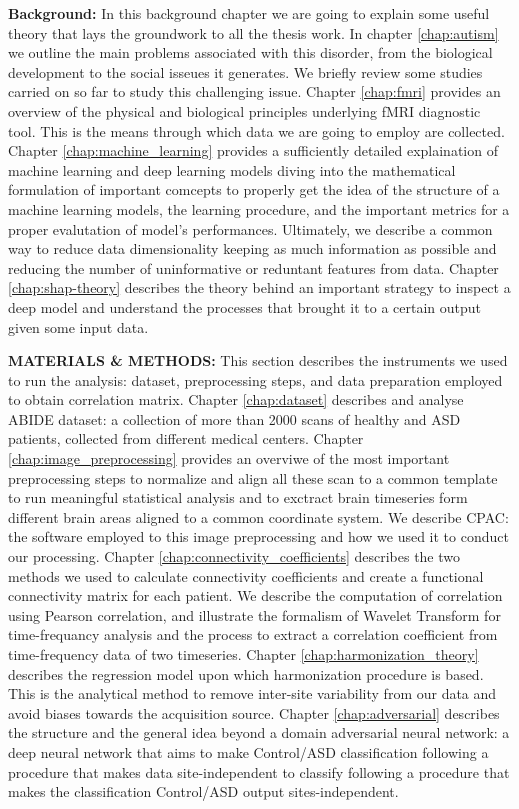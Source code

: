 \documentclass[10pt]{report}
\begin{document}
\textbf{Background:} In this background chapter we are going to explain some useful theory that lays the groundwork to all the thesis work.
In chapter \ref{chap:autism} we outline the main problems associated with this disorder, from the biological development to the social isseues it generates. We briefly review some studies carried on so far to study this challenging issue.
Chapter \ref{chap:fmri} provides an overview of the physical and biological principles underlying fMRI diagnostic tool. This is the means through which data we are going to employ are collected.
Chapter \ref{chap:machine_learning} provides a sufficiently detailed explaination of machine learning and deep learning models diving into the mathematical formulation of important comcepts to properly get the idea of the structure of a machine learning models, the learning procedure, and the important metrics for a proper evalutation of model's performances. Ultimately, we describe a common way to reduce data dimensionality keeping as much information as possible and reducing the number of uninformative or reduntant features from data.
Chapter \ref{chap:shap-theory} describes the theory behind an important strategy to inspect a deep model and understand the processes that brought it to a certain output given some input data.

\textbf{MATERIALS \& METHODS:} This section describes the instruments we used to run the analysis: dataset, preprocessing steps, and data preparation employed to obtain correlation matrix.
Chapter \ref{chap:dataset} describes and analyse ABIDE dataset: a collection of more than 2000 scans of healthy and ASD patients, collected from different medical centers.
Chapter \ref{chap:image_preprocessing} provides an overviwe of the most important preprocessing steps to normalize and align all these scan to a common template to run meaningful statistical analysis and to exctract brain timeseries form different brain areas aligned to a common coordinate system. We describe CPAC: the software employed to this image preprocessing and how we used it to conduct our processing.
Chapter \ref{chap:connectivity_coefficients} describes the two methods we used to calculate connectivity coefficients and create a functional connectivity matrix for each patient. We describe the computation of correlation using Pearson correlation, and illustrate the formalism of Wavelet Transform for time-frequancy analysis and the process to extract a correlation coefficient from time-frequency data of two timeseries.
Chapter \ref{chap:harmonization_theory} describes the regression model upon which harmonization procedure is based. This is the analytical method to remove inter-site variability from our data and avoid biases towards the acquisition source.
Chapter \ref{chap:adversarial} describes the structure and the general idea beyond a domain adversarial neural network: a deep neural network that aims
to make Control/ASD classification following a procedure that makes data site-independent to classify following a procedure that makes the classification Control/ASD output sites-independent.
\end{document}

